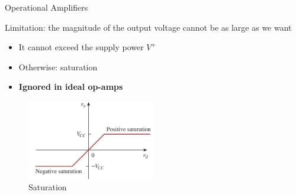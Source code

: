 \documentclass{beamer}
\begin{document}
\begin{frame}{Operational Amplifiers}


Limitation: the magnitude of the output voltage cannot be as large as we want
\begin{itemize}
    \item It cannot exceed the supply power $V^{+}$
    \item Otherwise: saturation
    \item \textbf{Ignored in ideal op-amps}
\end{itemize}
\begin{figure}[H]
    \centering
    \includegraphics[width=0.5\textwidth]{img_opamp/13_saturation.png}
    \caption{Saturation}
\end{figure}

\end{frame}
\end{document}

